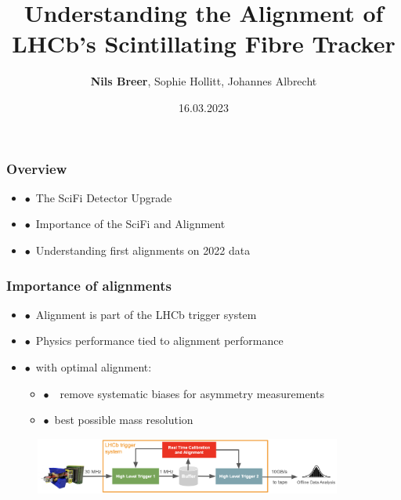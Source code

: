 \documentclass[aspectratio=1610, 12pt, xcolor=dvipsnames]{beamer}
\title{Understanding the Alignment of LHCb's Scintillating Fibre Tracker}
\author[N.Breer]{\textbf{Nils Breer}, Sophie Hollitt, Johannes Albrecht}
\institute{DPG spring Conference, Dresden}
\date{16.03.2023}
\begin{document}
\maketitle

\begin{frame}\frametitle{Overview}
  \begin{itemize}
    \item $\bullet$\, The SciFi Detector Upgrade
    \item $\bullet$\, Importance of the SciFi and Alignment
    \item $\bullet$\, Understanding first alignments on 2022 data
  \end{itemize}
\end{frame}

\begin{frame}\frametitle{Importance of alignments}
  \begin{itemize}
    \item $\bullet$\, Alignment is part of the LHCb trigger system
    \item $\bullet$\, Physics performance tied to alignment performance
    \item $\bullet$\, with optimal alignment:
    \begin{itemize}
      \item $\bullet$\, \to\, remove systematic biases for asymmetry measurements
      \item $\bullet$\, best possible mass resolution
    \end{itemize}
  \end{itemize}
  \begin{figure}
      \includegraphics[width=0.9\textwidth]{logos/dataflow.png}%
  \end{figure}
\end{frame}
\end{document}
